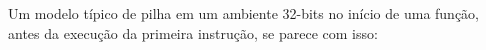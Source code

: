 
Um modelo típico de pilha em um ambiente 32-bits no início de uma função,
antes da execução da primeira instrução, se parece com isso:



